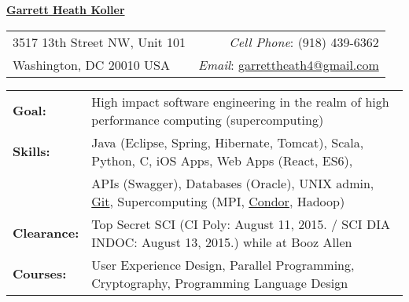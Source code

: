 \documentclass[11pt, letterpaper]{letter}
\newlength{\firstSectionSpacing} \setlength{\firstSectionSpacing}{6pt}
\newlength{\sectionSpacing}      \setlength{\sectionSpacing}{-1pt}
\begin{document}
\sffamily

\begin{center}{
	\underline{\Large{\textbf{Garrett Heath Koller}}}
}\end{center}
\vspace{-8pt}

\begin{tabular*}{\textwidth}{l@{\extracolsep{\fill}}r}
	3517 13th Street NW, Unit 101 & \textit{Cell Phone}: (918) 439-6362 \\
	Washington, DC  20010 USA & \textit{Email}:
	\href{mailto:garrettheath4@gmail.com}{garrettheath4@gmail.com} \\
	\hline
\end{tabular*}

\vspace{\firstSectionSpacing}



\begin{tabular*}{\textwidth}{ p{2.2cm} l }
	{\large \textbf{Goal:}}      & High impact software engineering in the realm of
	                               high performance computing (supercomputing) \\
	{\large \textbf{Skills:}}    & Java (Eclipse, Spring, Hibernate, Tomcat), Scala,
	                               Python, C, iOS Apps, Web Apps (React, ES6), \\
	                             & APIs (Swagger), Databases (Oracle), UNIX admin,
	                               \href{https://github.com/garrettheath4}{Git},
	                               Supercomputing (MPI,
	                               \href{http://www.htcondorproject.org/}{Condor},
	                               Hadoop) \\
	{\large \textbf{Clearance:}} & Top Secret SCI (CI Poly: August 11, 2015.  /  %
	                               SCI DIA INDOC: August 13, 2015.) while at Booz
	                               Allen \\
	{\large \textbf{Courses:}}   & User Experience Design, Parallel Programming,
	                               Cryptography, Programming Language Design
\end{tabular*}

\vspace{\firstSectionSpacing}
\vspace{\sectionSpacing}
\end{document}
